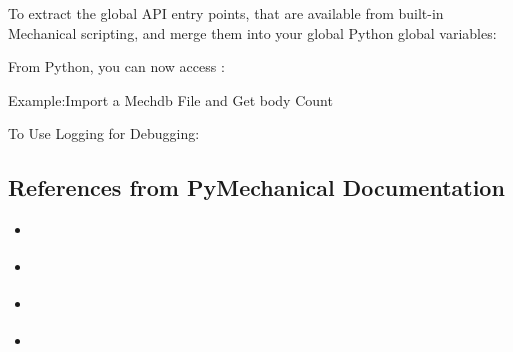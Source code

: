 \documentclass[9pt,landscape]{article}
\begin{document}
\begin{multicols}{3}

To extract the global API entry points, that are available from built-in Mechanical scripting, and merge them into your global Python global variables:


From Python, you can now access : 
 


Example:Import a Mechdb File and Get body Count


To Use Logging for Debugging:


\subsection{References from PyMechanical Documentation}
\begin{itemize}
    \item \href{https://mechanical.docs.pyansys.com/version/stable/getting_started/index.html}{\color{blue}{Getting Started}}
    \item \href{https://mechanical.docs.pyansys.com/version/stable/examples/index.html}{\color{blue}{Examples}}
    \item \href{https://mechanical.docs.pyansys.com/version/stable/api/index.html}{\color{blue}{API Reference}}
    \item \href{https://ansyshelp.ansys.com/account/secured?returnurl=/Views/Secured/corp/v231/en/act_script/act_script.html}{\color{blue}{Scripting in Mechanical}}
\end{itemize}
\end{multicols}
\end{document}
